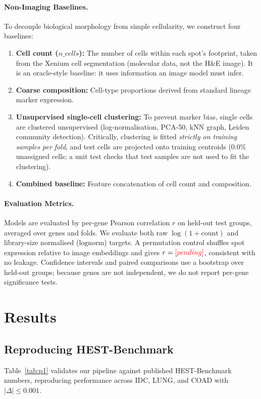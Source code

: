 \documentclass[10pt,twocolumn]{article}
\providecommand{\pending}{\textcolor{red}{[pending]}}
\newcommand{\num}[1]{\ifcsname #1\endcsname\csname #1\endcsname\else\pending\fi}
\begin{document}
\paragraph{Non-Imaging Baselines.}
To decouple biological morphology from simple cellularity, we construct four baselines:
\begin{enumerate}
    \item \textbf{Cell count ($n\_cells$):} The number of cells within each spot's footprint, taken from the Xenium cell segmentation (molecular data, not the H\&E image). It is an oracle-style baseline: it uses information an image model must infer.
    \item \textbf{Coarse composition:} Cell-type proportions derived from standard lineage marker expression.
    \item \textbf{Unsupervised single-cell clustering:} To prevent marker bias, single cells are clustered unsupervised (log-normalisation, PCA-50, kNN graph, Leiden community detection). Critically, clustering is fitted \emph{strictly on training samples per fold}, and test cells are projected onto training centroids (0.0\% unassigned cells; a unit test checks that test samples are not used to fit the clustering).
    \item \textbf{Combined baseline:} Feature concatenation of cell count and composition.
\end{enumerate}

\paragraph{Evaluation Metrics.}
Models are evaluated by per-gene Pearson correlation $r$ on held-out test groups, averaged over genes and folds. We evaluate both raw $\log(1+\text{count})$ and library-size normalised ($\text{lognorm}$) targets. A permutation control shuffles spot expression relative to image embeddings and gives $r = \num{AtlasNullR}$, consistent with no leakage. Confidence intervals and paired comparisons use a bootstrap over held-out groups; because genes are not independent, we do not report per-gene significance tests.

\section{Results}
\label{sec:results}

\subsection{Reproducing HEST-Benchmark}
\begin{table}[t]\centering\small
\caption{HEST-Benchmark reproduction (ridge + PCA-256, published protocol).}\label{tab:p1}\end{table}
Table~\ref{tab:p1} validates our pipeline against published HEST-Benchmark numbers, reproducing performance across IDC, LUNG, and COAD with $|\Delta| \le 0.001$.
\end{document}
